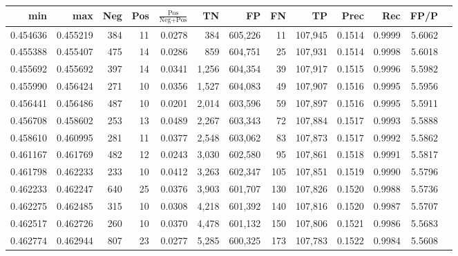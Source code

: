 \begin{tabular}{rrrrrrrrrrrrr}
\toprule
     min &      max &   Neg &   Pos & $\frac{\text{Pos}}{\text{Neg}+\text{Pos}}$ &      TN &      FP &      FN &      TP &   Prec &    Rec &   FP/P \\
\midrule
0.454636 & 0.455219 &   384 &    11 &                                     0.0278 &     384 & 605,226 &      11 & 107,945 & 0.1514 & 0.9999 & 5.6062 \\
0.455388 & 0.455407 &   475 &    14 &                                     0.0286 &     859 & 604,751 &      25 & 107,931 & 0.1514 & 0.9998 & 5.6018 \\
0.455692 & 0.455692 &   397 &    14 &                                     0.0341 &   1,256 & 604,354 &      39 & 107,917 & 0.1515 & 0.9996 & 5.5982 \\
0.455990 & 0.456424 &   271 &    10 &                                     0.0356 &   1,527 & 604,083 &      49 & 107,907 & 0.1516 & 0.9995 & 5.5956 \\
0.456441 & 0.456486 &   487 &    10 &                                     0.0201 &   2,014 & 603,596 &      59 & 107,897 & 0.1516 & 0.9995 & 5.5911 \\
0.456708 & 0.458602 &   253 &    13 &                                     0.0489 &   2,267 & 603,343 &      72 & 107,884 & 0.1517 & 0.9993 & 5.5888 \\
0.458610 & 0.460995 &   281 &    11 &                                     0.0377 &   2,548 & 603,062 &      83 & 107,873 & 0.1517 & 0.9992 & 5.5862 \\
0.461167 & 0.461769 &   482 &    12 &                                     0.0243 &   3,030 & 602,580 &      95 & 107,861 & 0.1518 & 0.9991 & 5.5817 \\
0.461798 & 0.462233 &   233 &    10 &                                     0.0412 &   3,263 & 602,347 &     105 & 107,851 & 0.1519 & 0.9990 & 5.5796 \\
0.462233 & 0.462247 &   640 &    25 &                                     0.0376 &   3,903 & 601,707 &     130 & 107,826 & 0.1520 & 0.9988 & 5.5736 \\
0.462275 & 0.462485 &   315 &    10 &                                     0.0308 &   4,218 & 601,392 &     140 & 107,816 & 0.1520 & 0.9987 & 5.5707 \\
0.462517 & 0.462726 &   260 &    10 &                                     0.0370 &   4,478 & 601,132 &     150 & 107,806 & 0.1521 & 0.9986 & 5.5683 \\
0.462774 & 0.462944 &   807 &    23 &                                     0.0277 &   5,285 & 600,325 &     173 & 107,783 & 0.1522 & 0.9984 & 5.5608 \\

\end{tabular}
